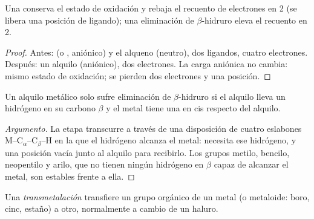 \begin{proposition}\label{prop:b2:catalytic-cycles:insertion}
Una  conserva el estado de oxidación y rebaja el recuento de electrones en 2
(se libera una posición de ligando); una eliminación de $\beta$-hidruro eleva el recuento en 2.
\end{proposition}

\begin{proof}
Antes:  (o , aniónico) y el alqueno (neutro), dos ligandos, cuatro electrones.
Después: un alquilo (aniónico), dos electrones. La carga aniónica no cambia: mismo
estado de oxidación; se pierden dos electrones y una posición.
\end{proof}

\begin{proposition}\label{prop:b2:catalytic-cycles:beta-h}
Un alquilo metálico solo sufre eliminación de $\beta$-hidruro si el alquilo lleva un hidrógeno en
su carbono $\beta$ y el metal tiene una  en cis respecto del alquilo.
\end{proposition}

\begin{proof}[Argumento]
La etapa transcurre a través de una disposición de cuatro eslabones M--C$_\alpha$--C$_\beta$--H en la que el
hidrógeno alcanza el metal: necesita ese hidrógeno, y una posición vacía junto al alquilo
para recibirlo. Los grupos metilo, bencilo, neopentilo y arilo, que no tienen ningún hidrógeno en $\beta$
capaz de alcanzar el metal, son estables frente a ella.
\end{proof}

\begin{definition}[Transmetalación]\label{def:b2:catalytic-cycles:transmetalation}
Una \emph{transmetalación} transfiere un grupo orgánico de un metal
(o metaloide: boro, cinc, estaño) a otro, normalmente a cambio de un haluro.
\end{definition}

